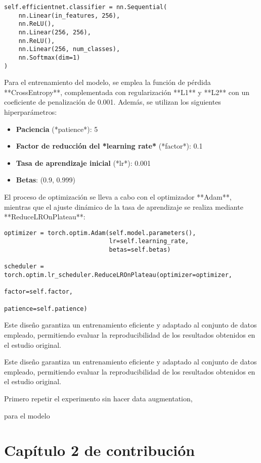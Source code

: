 \documentclass[11pt,spanish,listoffigures,listoftables]{tfgetsinf}
\begin{document}
\begin{verbatim}
self.efficientnet.classifier = nn.Sequential(
    nn.Linear(in_features, 256),
    nn.ReLU(),
    nn.Linear(256, 256),
    nn.ReLU(),
    nn.Linear(256, num_classes),
    nn.Softmax(dim=1)
)
\end{verbatim}

Para el entrenamiento del modelo, se emplea la función de pérdida **CrossEntropy**, complementada con regularización **L1** y **L2** con un coeficiente de penalización de 0.001. Además, se utilizan los siguientes hiperparámetros:

\begin{itemize}
    \item \textbf{Paciencia} (*patience*): 5
    \item \textbf{Factor de reducción del *learning rate*} (*factor*): 0.1
    \item \textbf{Tasa de aprendizaje inicial} (*lr*): 0.001
    \item \textbf{Betas}: (0.9, 0.999)
\end{itemize}

El proceso de optimización se lleva a cabo con el optimizador **Adam**, mientras que el ajuste dinámico de la tasa de aprendizaje se realiza mediante **ReduceLROnPlateau**:

\begin{verbatim}
optimizer = torch.optim.Adam(self.model.parameters(),
                             lr=self.learning_rate,
                             betas=self.betas)

scheduler = torch.optim.lr_scheduler.ReduceLROnPlateau(optimizer=optimizer,
                                                       factor=self.factor,
                                                       patience=self.patience)
\end{verbatim}

Este diseño garantiza un entrenamiento eficiente y adaptado al conjunto de datos empleado, permitiendo evaluar la reproducibilidad de los resultados obtenidos en el estudio original.

Este diseño garantiza un entrenamiento eficiente y adaptado al conjunto de datos empleado, permitiendo evaluar la reproducibilidad de los resultados obtenidos en el estudio original.



Primero repetir el experimento sin hacer data augmentation,

para el modelo 
\chapter{Capítulo 2 de contribución}   %
\end{document}
